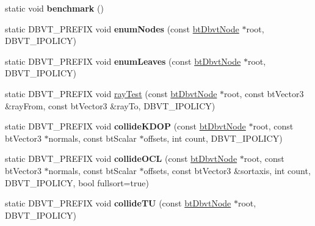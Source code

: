 \begin{DoxyCompactItemize}
\item 
\mbox{\label{structbtDbvt_a3a00928493333d8adf3d27282c3450e4}} 
static void {\bfseries benchmark} ()
\item 
\mbox{\label{structbtDbvt_a73a403e2245119ba3ac452bde20c1309}} 
static D\+B\+V\+T\+\_\+\+P\+R\+E\+F\+IX void {\bfseries enum\+Nodes} (const \hyperlink{structbtDbvtNode}{bt\+Dbvt\+Node} $\ast$root, D\+B\+V\+T\+\_\+\+I\+P\+O\+L\+I\+CY)
\item 
\mbox{\label{structbtDbvt_af1d370fc43053bd3970695c417deb877}} 
static D\+B\+V\+T\+\_\+\+P\+R\+E\+F\+IX void {\bfseries enum\+Leaves} (const \hyperlink{structbtDbvtNode}{bt\+Dbvt\+Node} $\ast$root, D\+B\+V\+T\+\_\+\+I\+P\+O\+L\+I\+CY)
\item 
static D\+B\+V\+T\+\_\+\+P\+R\+E\+F\+IX void \hyperlink{structbtDbvt_a7c46f4b9f5ee3df6970f94f2b0315859}{ray\+Test} (const \hyperlink{structbtDbvtNode}{bt\+Dbvt\+Node} $\ast$root, const bt\+Vector3 \&ray\+From, const bt\+Vector3 \&ray\+To, D\+B\+V\+T\+\_\+\+I\+P\+O\+L\+I\+CY)
\item 
\mbox{\label{structbtDbvt_a5f5caed3948f494f5f25a89fdef1a21b}} 
static D\+B\+V\+T\+\_\+\+P\+R\+E\+F\+IX void {\bfseries collide\+K\+D\+OP} (const \hyperlink{structbtDbvtNode}{bt\+Dbvt\+Node} $\ast$root, const bt\+Vector3 $\ast$normals, const bt\+Scalar $\ast$offsets, int count, D\+B\+V\+T\+\_\+\+I\+P\+O\+L\+I\+CY)
\item 
\mbox{\label{structbtDbvt_a8a5facc8bacad531e720fc5ee82b0d0b}} 
static D\+B\+V\+T\+\_\+\+P\+R\+E\+F\+IX void {\bfseries collide\+O\+CL} (const \hyperlink{structbtDbvtNode}{bt\+Dbvt\+Node} $\ast$root, const bt\+Vector3 $\ast$normals, const bt\+Scalar $\ast$offsets, const bt\+Vector3 \&sortaxis, int count, D\+B\+V\+T\+\_\+\+I\+P\+O\+L\+I\+CY, bool fullsort=true)
\item 
\mbox{\label{structbtDbvt_adc2dded98685d678d43fb2d69c012bbf}} 
static D\+B\+V\+T\+\_\+\+P\+R\+E\+F\+IX void {\bfseries collide\+TU} (const \hyperlink{structbtDbvtNode}{bt\+Dbvt\+Node} $\ast$root, D\+B\+V\+T\+\_\+\+I\+P\+O\+L\+I\+CY)
\item 
\mbox{\label{structbtDbvt_a09363b697138f2d1d51fea62ad147f9b}} 

\end{DoxyCompactItemize}
